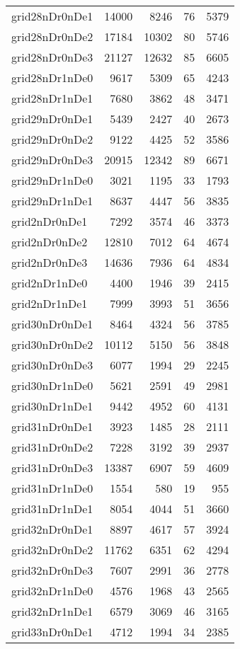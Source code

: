 \begin{longtable}{lrrrr}
grid28nDr0nDe1 & 14000 & 8246 & 76 & 5379 \\
grid28nDr0nDe2 & 17184 & 10302 & 80 & 5746 \\
grid28nDr0nDe3 & 21127 & 12632 & 85 & 6605 \\
grid28nDr1nDe0 & 9617 & 5309 & 65 & 4243 \\
grid28nDr1nDe1 & 7680 & 3862 & 48 & 3471 \\
grid29nDr0nDe1 & 5439 & 2427 & 40 & 2673 \\
grid29nDr0nDe2 & 9122 & 4425 & 52 & 3586 \\
grid29nDr0nDe3 & 20915 & 12342 & 89 & 6671 \\
grid29nDr1nDe0 & 3021 & 1195 & 33 & 1793 \\
grid29nDr1nDe1 & 8637 & 4447 & 56 & 3835 \\
grid2nDr0nDe1 & 7292 & 3574 & 46 & 3373 \\
grid2nDr0nDe2 & 12810 & 7012 & 64 & 4674 \\
grid2nDr0nDe3 & 14636 & 7936 & 64 & 4834 \\
grid2nDr1nDe0 & 4400 & 1946 & 39 & 2415 \\
grid2nDr1nDe1 & 7999 & 3993 & 51 & 3656 \\
grid30nDr0nDe1 & 8464 & 4324 & 56 & 3785 \\
grid30nDr0nDe2 & 10112 & 5150 & 56 & 3848 \\
grid30nDr0nDe3 & 6077 & 1994 & 29 & 2245 \\
grid30nDr1nDe0 & 5621 & 2591 & 49 & 2981 \\
grid30nDr1nDe1 & 9442 & 4952 & 60 & 4131 \\
grid31nDr0nDe1 & 3923 & 1485 & 28 & 2111 \\
grid31nDr0nDe2 & 7228 & 3192 & 39 & 2937 \\
grid31nDr0nDe3 & 13387 & 6907 & 59 & 4609 \\
grid31nDr1nDe0 & 1554 & 580 & 19 & 955 \\
grid31nDr1nDe1 & 8054 & 4044 & 51 & 3660 \\
grid32nDr0nDe1 & 8897 & 4617 & 57 & 3924 \\
grid32nDr0nDe2 & 11762 & 6351 & 62 & 4294 \\
grid32nDr0nDe3 & 7607 & 2991 & 36 & 2778 \\
grid32nDr1nDe0 & 4576 & 1968 & 43 & 2565 \\
grid32nDr1nDe1 & 6579 & 3069 & 46 & 3165 \\
grid33nDr0nDe1 & 4712 & 1994 & 34 & 2385 \\

\end{longtable}

